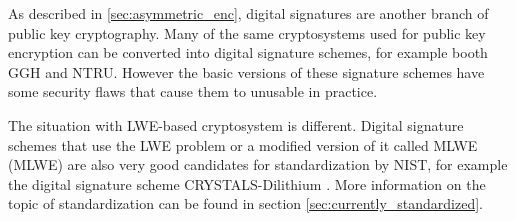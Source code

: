 As described in \ref{sec:asymmetric_enc}, digital signatures are another branch of public key cryptography. Many of the same cryptosystems used for public key encryption can be converted into digital signature schemes, for example booth GGH and NTRU. However the basic versions of these signature schemes have some security flaws that cause them to unusable in practice. \cite{Bernstein2009}

The situation with LWE-based cryptosystem is different. Digital signature schemes that use the LWE problem or a modified version of it called MLWE (\acl{MLWE}) are also very good candidates for standardization by NIST, for example the digital signature scheme CRYSTALS-Dilithium \cite{Grimes2020}. More information on the topic of standardization can be found in section \ref{sec:currently_standardized}.